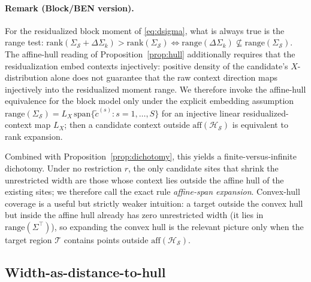 \paragraph{Remark (Block/BEN version).}
For the residualized block moment of \eqref{eq:dsigma}, what is always true is
the range test:
$\mathrm{rank}(\Sigma_\mathcal{S}+\Delta\Sigma_k)>\mathrm{rank}(\Sigma_\mathcal{S})
 \iff \mathrm{range}(\Delta\Sigma_k)\not\subseteq\mathrm{range}(\Sigma_\mathcal{S})$.
The affine-hull reading of Proposition~\ref{prop:hull} additionally
requires that the residualization embed contexts injectively: positive density
of the candidate's $X$-distribution alone does not guarantee that the raw
context direction maps injectively into the residualized moment range. We
therefore invoke the affine-hull equivalence for the block model only under the
explicit embedding assumption
$\mathrm{range}(\Sigma_\mathcal{S})=L_X\,\mathrm{span}\{\tilde c^{(s)}:s=1,\dots,S\}$
for an injective linear residualized-context map $L_X$; then a candidate context
outside $\mathrm{aff}(\mathcal{H}_\mathcal{S})$ is equivalent to rank expansion.

Combined with Proposition~\ref{prop:dichotomy}, this yields a
finite-versus-infinite dichotomy. Under no restriction $r$, the only candidate
sites that shrink the unrestricted width are those whose context lies outside
the affine hull of the existing sites; we therefore call the exact rule
\emph{affine-span expansion}. Convex-hull coverage is a useful but strictly
weaker intuition: a target outside the convex hull but inside the affine hull
already has zero unrestricted width (it lies in $\mathrm{range}(\Sigma^\top)$),
so expanding the convex hull is the relevant picture only when the target region
$\mathcal{T}$ contains points outside $\mathrm{aff}(\mathcal{H}_\mathcal{S})$.

\subsection{Width-as-distance-to-hull}
\label{sec:hull-distance}

